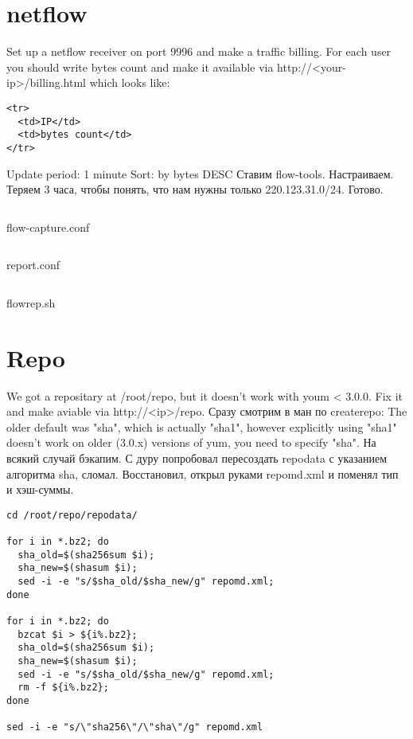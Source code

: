 \documentclass[a4paper,10pt]{report}
\begin{document}
\chapter{netflow}
Set up a netflow receiver on port 9996 and make a traffic billing.
\newline
For each user you should write bytes count and make it available via http://<your-ip>/billing.html which looks like:
\newline
\begin{verbatim}
<tr>
  <td>IP</td>
  <td>bytes count</td>
</tr>
\end{verbatim}
Update period: 1 minute
\newline
Sort: by bytes DESC
\newline\newline
Ставим flow-tools. Настраиваем. Теряем 3 часа, чтобы понять, что нам нужны только 220.123.31.0/24. Готово.
\begin{listing}[H]
  \inputminted[linenos=true, fontsize=\scriptsize, samepage=true]{text}{flow-capture.conf}
  \caption{flow-capture.conf}
  \label{lst:flow-capture.conf}
\end{listing}
\begin{listing}[H]
  \inputminted[linenos=true, fontsize=\scriptsize, samepage=true]{text}{report.conf}
  \caption{report.conf}
  \label{lst:report.conf}
\end{listing}
\begin{listing}[H]
  \inputminted[linenos=true, fontsize=\scriptsize, samepage=true]{bash}{flowrep.sh}
  \caption{flowrep.sh}
  \label{lst:flowrep.sh}
\end{listing}

\chapter{Repo}
We got a repositary at /root/repo, but it doesn't work with youm < 3.0.0. Fix it and make aviable via http://<ip>/repo.
\newline\newline
Сразу смотрим в ман по createrepo:
\newline
The older default was "sha", which is actually "sha1", however explicitly using "sha1" doesn't work on older (3.0.x) versions of yum, you need to specify "sha".
\newline
На всякий случай бэкапим. С дуру попробовал пересоздать repodata с указанием алгоритма sha, сломал. Восстановил, открыл руками repomd.xml и поменял тип и хэш-суммы.
\newline
\begin{verbatim}
cd /root/repo/repodata/

for i in *.bz2; do
  sha_old=$(sha256sum $i);
  sha_new=$(shasum $i);
  sed -i -e "s/$sha_old/$sha_new/g" repomd.xml;
done

for i in *.bz2; do
  bzcat $i > ${i%.bz2};
  sha_old=$(sha256sum $i);
  sha_new=$(shasum $i);
  sed -i -e "s/$sha_old/$sha_new/g" repomd.xml;
  rm -f ${i%.bz2};
done

sed -i -e "s/\"sha256\"/\"sha\"/g" repomd.xml
\end{verbatim}
\end{document}
